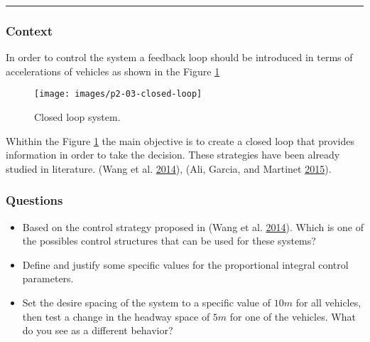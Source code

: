 \documentclass[]{book}
\providecommand{\tightlist}{%
  \setlength{\itemsep}{0pt}\setlength{\parskip}{0pt}}
\theoremstyle{definition}
\theoremstyle{definition}
\theoremstyle{definition}
\theoremstyle{remark}
\begin{document}
\begin{center}\rule{0.5\linewidth}{\linethickness}\end{center}

\hypertarget{context-7}{%
\subsubsection*{Context}\label{context-7}}

In order to control the system a feedback loop should be introduced in
terms of accelerations of vehicles as shown in the Figure
\ref{fig:closedcav}



\begin{figure}

{\centering \texttt{[image: images/p2-03-closed-loop]} 

}

\caption{Closed loop system.}\label{fig:closedcav}
\end{figure}

Whithin the Figure \ref{fig:closedcav} the main objective is to create a
closed loop that provides information in order to take the decision.
These strategies have been already studied in literature. (Wang et al.
\protect\hyperlink{ref-Meng2014b:TR-C}{2014}), (Ali, Garcia, and
Martinet \protect\hyperlink{ref-Ali2015:ITSM}{2015}).

\hypertarget{questions-6}{%
\subsubsection*{Questions}\label{questions-6}}

\begin{itemize}
\tightlist
\item
  Based on the control strategy proposed in (Wang et al.
  \protect\hyperlink{ref-Meng2014b:TR-C}{2014}). Which is one of the
  possibles control structures that can be used for these systems?
\item
  Define and justify some specific values for the proportional integral
  control parameters.
\item
  Set the desire spacing of the system to a specific value of \(10m\)
  for all vehicles, then test a change in the headway space of \(5m\)
  for one of the vehicles. What do you see as a different behavior?
\end{itemize}
\end{document}
